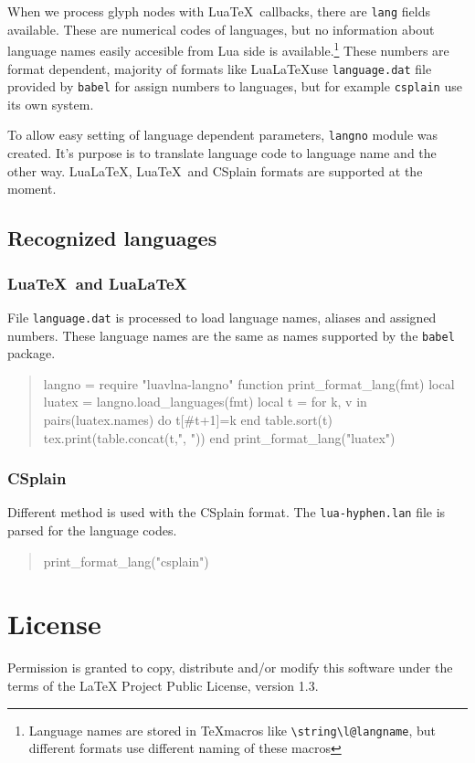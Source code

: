 \documentclass[12pt]{ltxdoc}
\begin{document}
When we process glyph nodes with Lua\TeX\ callbacks, there are \verb|lang| 
fields available. These are numerical codes of languages, but no information
about language names easily accesible from Lua side is available.\footnote{%
	Language names are stored in \TeX macros like \verb|\string\l@langname|, but 
	different formats use different naming of these macros}
These numbers are format dependent, majority of formats like 
Lua\LaTeX use \verb|language.dat| file provided by \verb|babel| 
for assign numbers to languages, but for example \verb|csplain| 
use its own system.

To allow easy setting of language dependent parameters, \verb|langno| module 
was created. It's purpose is to translate language code to language name and 
the other way. Lua\LaTeX, Lua\TeX\ and CSplain formats are supported at the moment.

\subsection{Recognized languages}
\subsubsection{Lua\TeX\ and Lua\LaTeX}

File \verb|language.dat| is processed to load language names, aliases and assigned numbers. These language names are the same as names supported by the \verb|babel| package.

\begin{quotation}
  \small\noindent
\begin{luacode*}
  langno = require "luavlna-langno"
  function print_format_lang(fmt)
    local luatex = langno.load_languages(fmt)
    local t = {}
    for k, v in pairs(luatex.names) do
      t[#t+1]=k
    end
    table.sort(t)
    tex.print(table.concat(t,", "))
  end
  print_format_lang("luatex")
\end{luacode*}
\end{quotation}

\subsubsection{CSplain}

Different method is used with the CSplain format. The \verb|lua-hyphen.lan| file is parsed for the language codes.

\begin{quotation}
  \small\noindent
  \begin{luacode*}
    print_format_lang("csplain")
  \end{luacode*}
\end{quotation}


\section{License}

Permission is granted to copy, distribute and/or modify this software
under the terms of the LaTeX Project Public License, version 1.3.
\end{document}
